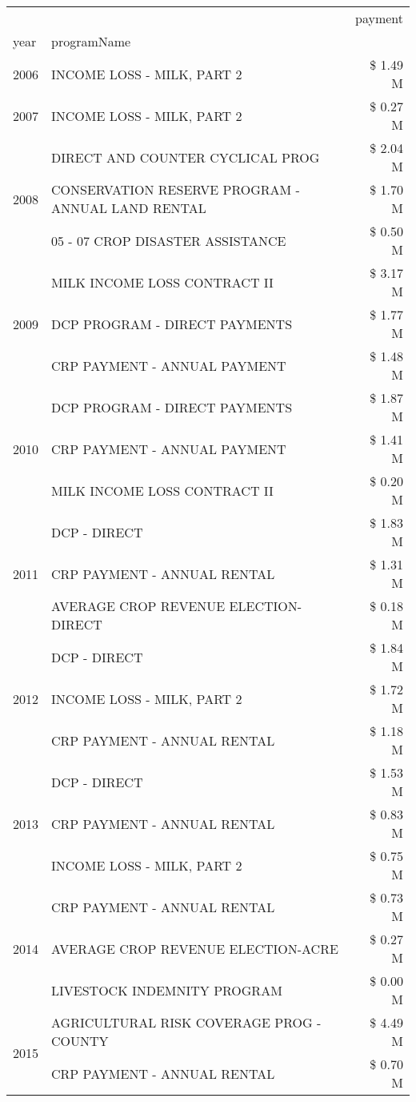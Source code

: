 \begin{tabular}{llr}
\toprule
 &  & payment \\
year & programName &  \\
\midrule
2006 & INCOME LOSS - MILK, PART 2 & \$ 1.49 M \\
\cline{1-3}
2007 & INCOME LOSS - MILK, PART 2 & \$ 0.27 M \\
\cline{1-3}
\multirow[t]{3}{*}{2008} & DIRECT AND COUNTER CYCLICAL PROG & \$ 2.04 M \\
 & CONSERVATION RESERVE PROGRAM - ANNUAL LAND RENTAL & \$ 1.70 M \\
 & 05 - 07 CROP DISASTER ASSISTANCE & \$ 0.50 M \\
\cline{1-3}
\multirow[t]{3}{*}{2009} & MILK INCOME LOSS CONTRACT II & \$ 3.17 M \\
 & DCP PROGRAM - DIRECT PAYMENTS & \$ 1.77 M \\
 & CRP PAYMENT - ANNUAL PAYMENT & \$ 1.48 M \\
\cline{1-3}
\multirow[t]{3}{*}{2010} & DCP PROGRAM - DIRECT PAYMENTS & \$ 1.87 M \\
 & CRP PAYMENT - ANNUAL PAYMENT & \$ 1.41 M \\
 & MILK INCOME LOSS CONTRACT II & \$ 0.20 M \\
\cline{1-3}
\multirow[t]{3}{*}{2011} & DCP - DIRECT & \$ 1.83 M \\
 & CRP PAYMENT - ANNUAL RENTAL & \$ 1.31 M \\
 & AVERAGE CROP REVENUE ELECTION-DIRECT & \$ 0.18 M \\
\cline{1-3}
\multirow[t]{3}{*}{2012} & DCP - DIRECT & \$ 1.84 M \\
 & INCOME LOSS - MILK, PART 2 & \$ 1.72 M \\
 & CRP PAYMENT - ANNUAL RENTAL & \$ 1.18 M \\
\cline{1-3}
\multirow[t]{3}{*}{2013} & DCP - DIRECT & \$ 1.53 M \\
 & CRP PAYMENT - ANNUAL RENTAL & \$ 0.83 M \\
 & INCOME LOSS - MILK, PART 2 & \$ 0.75 M \\
\cline{1-3}
\multirow[t]{3}{*}{2014} & CRP PAYMENT - ANNUAL RENTAL & \$ 0.73 M \\
 & AVERAGE CROP REVENUE ELECTION-ACRE & \$ 0.27 M \\
 & LIVESTOCK INDEMNITY PROGRAM & \$ 0.00 M \\
\cline{1-3}
\multirow[t]{3}{*}{2015} & AGRICULTURAL RISK COVERAGE PROG - COUNTY & \$ 4.49 M \\
 & CRP PAYMENT - ANNUAL RENTAL & \$ 0.70 M \\

\end{tabular}
